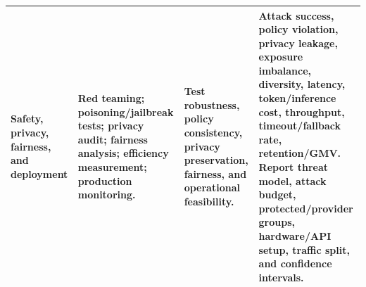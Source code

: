 \begin{table}[!t]
\begin{tabularx}{\textwidth}{@{}p{}p{}p{}X@{}}
Safety, privacy, fairness, and deployment & Red teaming; poisoning/jailbreak tests; privacy audit; fairness analysis; efficiency measurement; production monitoring. & Test robustness, policy consistency, privacy preservation, fairness, and operational feasibility. & Attack success, policy violation, privacy leakage, exposure imbalance, diversity, latency, token/inference cost, throughput, timeout/fallback rate, retention/GMV. Report threat model, attack budget, protected/provider groups, hardware/API setup, traffic split, and confidence intervals. \\
\bottomrule
\end{tabularx}
\end{table}